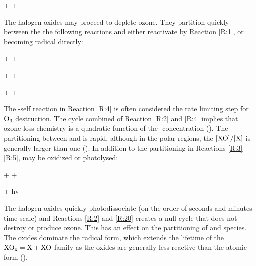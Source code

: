 \begin{reaction}
     +  \rightarrow {} + 
    \label{R:2}
\end{reaction}

The halogen oxides may proceed to deplete ozone. They partition quickly between the the following reactions and either reactivate by Reaction \ref{R:1}, or becoming radical directly:


\begin{reaction}
     +  \rightarrow {} +  \label{R:3} 
\end{reaction}


\begin{reaction}
     +  \rightarrow {} +  +  \label{R:4} 
\end{reaction}


\begin{reaction}
     +  \rightarrow {} +  \label{R:5} 
\end{reaction}

The -self reaction in Reaction \ref{R:4} is often considered the rate limiting step for $\mathrm{O_3}$ destruction. The cycle combined of Reaction \ref{R:2} and \ref{R:4} implies that ozone loss chemistry is a quadratic function of the -concentration (\cite{Hausmann1994}). The partitioning between  and  is rapid, although in the polar regions, the $[\mathrm{XO}]/[\mathrm{X}]$ is generally larger than one (\cite{Schmidt}). In addition to the partitioning in Reactions \ref{R:3}-\ref{R:5},  may be oxidized or photolysed:  

\begin{reaction}
     +  \rightarrow {} + 
    \label{R:15}
\end{reaction}

\begin{reaction}
     + hv \rightarrow {} + 
    \label{R:20}
\end{reaction}

The halogen oxides quickly photodissociate (on the order of seconds and minutes time scale) and Reactions \ref{R:2} and \ref{R:20} creates a null cycle that does not destroy or produce ozone. This has an effect on the partitioning of  and  species. The oxides dominate the radical form, which extends the lifetime of the $\mathrm{XO_x} = \mathrm{X} + \mathrm{XO}$-family as the oxides are generally less reactive than the atomic form (\cite{Simpson2015}). 


